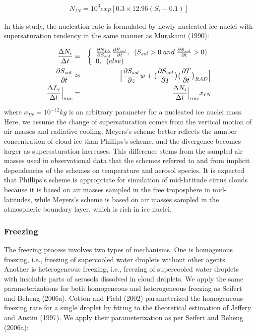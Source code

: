 \begin{eqnarray}
N_{IN}=10^{3}exp[0.3\times12.96(S_{i}-0.1)]\label{sn117}
\end{eqnarray}

In this study, the nucleation rate is formulated by newly nucleated ice nuclei with supersaturation tendency in the same manner as Murakami (1990):

\begin{eqnarray}
\frac{\Delta N_{i}}{\Delta t}&=&
\left\{
\begin{array}{l}
\frac{\partial N_{IN}}{\partial S_{sol}}\frac{\partial S_{sol}}{\partial t},\;\;(S_{sol}>0\;and\;\frac{\partial S_{sol}}{\partial t}>0) \\
0,\;\;(else) \\
\end{array}
\right.\\
\label{sn118}
\frac{\partial S_{sol}}{\partial t}&\approx& \Bigl[\frac{\partial S_{sol}}{\partial z}w+\bigl(\frac{\partial S_{sol}}{\partial T}\bigr)\bigl(\frac{\partial T}{\partial t}\bigr)_{RAD}\Bigr]\nonumber\\
\frac{\Delta L_{i}}{\Delta t}\Bigr|_{nuc}&=&\frac{\Delta N_{i}}{\Delta t}\Bigr|_{nuc}x_{IN}\label{sn119}
\end{eqnarray}

where $x_{IN} = 10^{-12} kg$ is an arbitrary parameter for a nucleated ice nuclei mass. Here, we assume the change of supersaturation comes from the vertical motion of air masses and radiative cooling. Meyers’s scheme better reflects the number concentration of cloud ice than Phillips’s scheme, and the divergence becomes larger as supersaturation increases. This difference stems from the sampled air masses used in observational data that the schemes referred to and from implicit dependencies of the schemes on temperature and aerosol species. It is expected that Phillips’s scheme is appropriate for simulation of mid-latitude cirrus clouds because it is based on air masses sampled in the free troposphere in mid-latitudes, while Meyers’s scheme is based on air masses sampled in the atmospheric boundary layer, which is rich in ice nuclei.

\subsubsection{Freezing}
The freezing process involves two types of mechanisms. One is homogenous freezing, i.e., freezing of supercooled water droplets without other agents. Another is heterogeneous freezing, i.e., freezing of supercooled water droplets with insoluble parts of aerosols dissolved in cloud droplets. We apply the same parameterizations for both homogeneous and heterogeneous freezing as Seifert and Beheng (2006a). Cotton and Field (2002) parameterized the homogeneous freezing rate for a single droplet by fitting to the theoretical estimation of Jeffery and Austin (1997). We apply their parameterization as per Seifert and Beheng (2006a):

